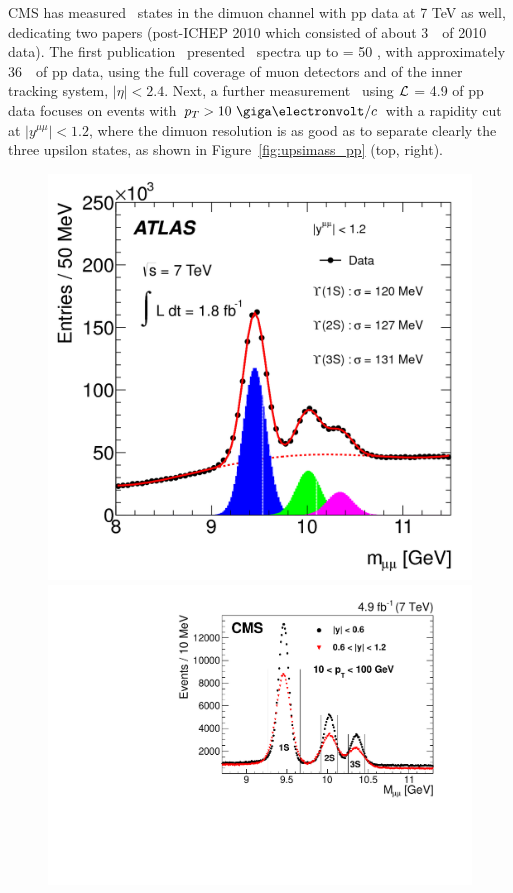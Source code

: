 CMS has measured \PgU~states in the dimuon channel with pp data at 7
TeV as well, dedicating two papers (post-ICHEP
2010 which consisted of about 3~\invpb~of 2010 data). The first
publication~\cite{cmsUpsi1} presented \PgU~spectra up to \pt = 50 \GeVc, with
approximately 36~\invpb~of pp data, using the full coverage of muon
detectors and of the inner tracking system, $\vert\eta\vert <
2.4$. Next, a further measurement~\cite{cmsUpsi2} using $\mathcal{L}$ = 4.9
\invfb of pp data focuses on events with $\pt > 10~\GeVc$ with a rapidity
cut at $\vert y^{\mu\mu}\vert < 1.2$, where the dimuon resolution is as good as
to separate clearly the three upsilon states, as shown in
Figure~\ref{fig:upsimass_pp} (top, right).

\begin{figure}[h]
\begin{center}
 \hspace{0.5cm} \includegraphics[height=0.2\textheight]{Chapters/pQuarkonia/AtlasUpsi.pdf}
  \includegraphics[height=0.21\textheight]{Chapters/pQuarkonia/CMSUpsi.pdf}

\end{center}
\end{figure}
